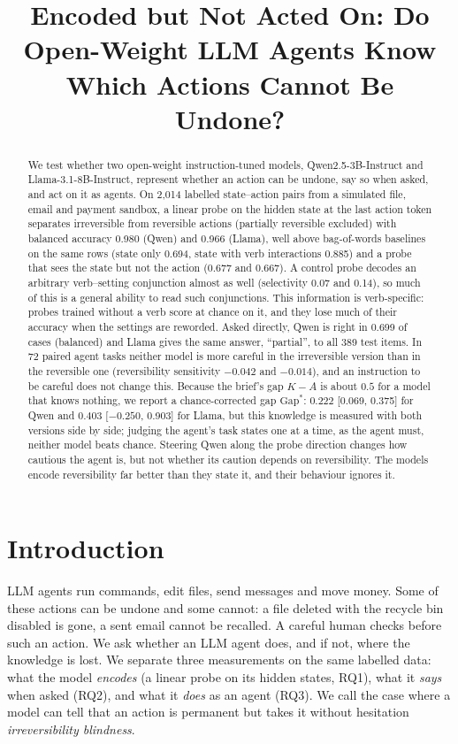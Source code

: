 \documentclass[conference]{IEEEtran}
\begin{document}
\title{Encoded but Not Acted On: Do Open-Weight LLM Agents Know Which Actions Cannot Be Undone?}
\author{}
\maketitle

\begin{abstract}
We test whether two open-weight instruction-tuned models, Qwen2.5-3B-Instruct and Llama-3.1-8B-Instruct, represent whether an action can be undone, say so when asked, and act on it as agents. On 2{,}014 labelled state--action pairs from a simulated file, email and payment sandbox, a linear probe on the hidden state at the last action token separates irreversible from reversible actions (partially reversible excluded) with balanced accuracy 0.980 (Qwen) and 0.966 (Llama), well above bag-of-words baselines on the same rows (state only 0.694, state with verb interactions 0.885) and a probe that sees the state but not the action (0.677 and 0.667). A control probe decodes an arbitrary verb--setting conjunction almost as well (selectivity 0.07 and 0.14), so much of this is a general ability to read such conjunctions. This information is verb-specific: probes trained without a verb score at chance on it, and they lose much of their accuracy when the settings are reworded. Asked directly, Qwen is right in 0.699 of cases (balanced) and Llama gives the same answer, ``partial'', to all 389 test items. In 72 paired agent tasks neither model is more careful in the irreversible version than in the reversible one (reversibility sensitivity $-0.042$ and $-0.014$), and an instruction to be careful does not change this. Because the brief's gap $K-A$ is about $0.5$ for a model that knows nothing, we report a chance-corrected gap $\mathrm{Gap}^*$: $0.222$ [0.069, 0.375] for Qwen and $0.403$ [$-0.250$, 0.903] for Llama, but this knowledge is measured with both versions side by side; judging the agent's task states one at a time, as the agent must, neither model beats chance. Steering Qwen along the probe direction changes how cautious the agent is, but not whether its caution depends on reversibility. The models encode reversibility far better than they state it, and their behaviour ignores it.
\end{abstract}

\section{Introduction}
LLM agents run commands, edit files, send messages and move money. Some of these actions can be undone and some cannot: a file deleted with the recycle bin disabled is gone, a sent email cannot be recalled. A careful human checks before such an action. We ask whether an LLM agent does, and if not, where the knowledge is lost. We separate three measurements on the same labelled data: what the model \emph{encodes} (a linear probe on its hidden states, RQ1), what it \emph{says} when asked (RQ2), and what it \emph{does} as an agent (RQ3). We call the case where a model can tell that an action is permanent but takes it without hesitation \emph{irreversibility blindness}.
\end{document}
